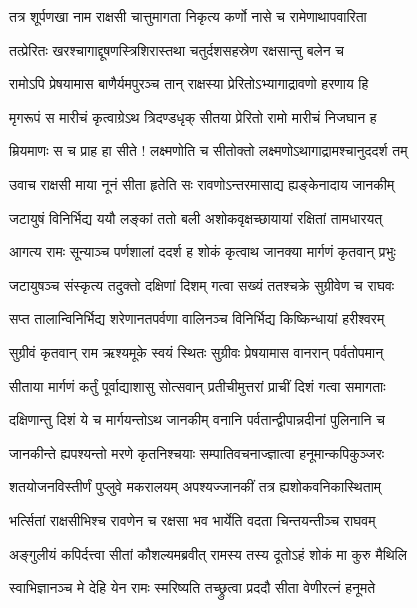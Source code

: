 \twolineshloka
{तत्र शूर्पणखा नाम राक्षसी चात्तुमागता}
{निकृत्य कर्णो नासे च रामेणाथापवारिता} %

\twolineshloka
{तत्प्रेरितः खरश्चागाद्दूषणस्त्रिशिरास्तथा}
{चतुर्दशसहस्रेण रक्षसान्तु बलेन च} %

\twolineshloka
{रामोऽपि प्रेषयामास बाणैर्यमपुरञ्च तान्}
{राक्षस्या प्रेरितोऽभ्यागाद्रावणो हरणाय हि} %

\twolineshloka
{मृगरूपं स मारीचं कृत्वाग्रेऽथ त्रिदण्डधृक्}
{सीतया प्रेरितो रामो मारीचं निजघान ह} %

\twolineshloka
{म्रियमाणः स च प्राह हा सीते ! लक्ष्मणोति च}
{सीतोक्तो लक्ष्मणोऽथागाद्रामश्चानुददर्श तम्} %

\twolineshloka
{उवाच राक्षसी माया नूनं सीता हृतेति सः}
{रावणोऽन्तरमासाद्य ह्यङ्केनादाय जानकीम्} %

\twolineshloka
{जटायुषं विनिर्भिद्य ययौ लङ्कां ततो बली}
{अशोकवृक्षच्छायायां रक्षितां तामधारयत्} %

\twolineshloka
{आगत्य रामः सून्याञ्च पर्णशालां ददर्श ह}
{शोकं कृत्वाथ जानक्या मार्गणं कृतवान् प्रभुः} %

\twolineshloka
{जटायुषञ्च संस्कृत्य तदुक्तो दक्षिणां दिशम्}
{गत्वा सख्यं ततश्चक्रे सुग्रीवेण च राघवः} %

\twolineshloka
{सप्त तालान्विनिर्भिद्य शरेणानतपर्वणा}
{वालिनञ्च विनिर्भिद्य किष्किन्धायां हरीश्वरम्} %

\twolineshloka
{सुग्रीवं कृतवान् राम ऋश्यमूके स्वयं स्थितः}
{सुग्रीवः प्रेषयामास वानरान् पर्वतोपमान्} %

\twolineshloka
{सीताया मार्गणं कर्तुं पूर्वाद्याशासु सोत्सवान्}
{प्रतीचीमुत्तरां प्राचीं दिशं गत्वा समागताः} %

\twolineshloka
{दक्षिणान्तु दिशं ये च मार्गयन्तोऽथ जानकीम्}
{वनानि पर्वतान्द्वीपान्नदीनां पुलिनानि च} %

\twolineshloka
{जानकीन्ते ह्यपश्यन्तो मरणे कृतनिश्चयाः}
{सम्पातिवचनाज्ज्ञात्वा हनूमान्कपिकुञ्जरः} %

\twolineshloka
{शतयोजनविस्तीर्णं पुप्लुवे मकरालयम्}
{अपश्यज्जानकीं तत्र ह्यशोकवनिकास्थिताम्} %

\twolineshloka
{भर्त्सितां राक्षसीभिश्च रावणेन च रक्षसा}
{भव भार्येति वदता चिन्तयन्तीञ्च राघवम्} %

\twolineshloka
{अङ्गुलीयं कपिर्दत्त्वा सीतां कौशल्यमब्रवीत्}
{रामस्य तस्य दूतोऽहं शोकं मा कुरु मैथिलि} %

\twolineshloka
{स्वाभिज्ञानञ्च मे देहि येन रामः स्मरिष्यति}
{तच्छ्रुत्वा प्रददौ सीता वेणीरत्नं हनूमते} %

